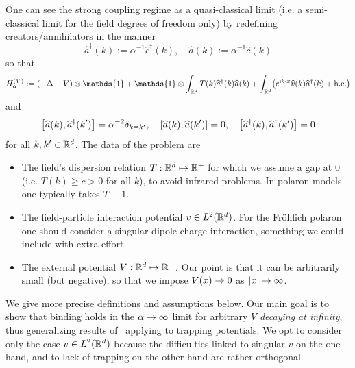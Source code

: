 \documentclass[10pt]{amsart}
\theoremstyle{definition}\newtheorem{defi}[theo]{Definition}\newtheorem{rema}[theo]{Remark}\newtheorem{exam}[theo]{Example}\newtheorem{exem}[theo]{Example}\newtheorem{nota}[theo]{Notation}
\newcommand{\im}{\mathrm{i}}
\newcommand{\R}{\mathbb{R}}
\newcommand{\1}{\mathds{1}}
\let\oldin\in
\renewcommand{\in}{\mathchoice{\oldin}{\oldin}{\,\oldin\,}{\,\oldin\,}}
\renewcommand*{\to}{\mathchoice{\longrightarrow}{\rightarrow}{\rightarrow}{\rightarrow}}
\let\oldmapsto\mapsto
\renewcommand*{\mapsto}{\mathchoice{\longmapsto}{\oldmapsto}{\oldmapsto}{\oldmapsto}}
\let\originalleft\left
\let\originalright\right
\renewcommand{\left}{\mathopen{}\mathclose\bgroup\originalleft}
\renewcommand{\right}{\aftergroup\egroup\originalright}
\begin{document}
One can see the strong coupling regime as a quasi-classical limit (i.e. a semi-classical limit for the field degrees of freedom only) by redefining creators/annihilators in the manner
\begin{equation}\label{eq:scaleop}
\widehat{a}^\dagger (k) := \alpha^{-1} \widehat{c}^\dagger (k), \quad \widehat{a} (k) := \alpha^{-1} \widehat{c} (k)
\end{equation}
so that
\begin{equation}\label{eq:intro-hamil-bis}
H_\alpha ^{(V)} := \left(-\Delta + V\right) \otimes \1 + \1 \otimes \int_{\R^d} T(k) \widehat{a}^\dagger (k) \widehat{a} (k) + \int_{\R^d} \left(e^{\im k\cdot x} \widehat{v} (k) \widehat{a}^{\dagger} (k) + \text{h.c.} \right)
\end{equation}
and
\begin{equation}\label{eq:intro CCR}
\left[\widehat{a} (k), \widehat{a}^\dagger (k')\right] = \alpha^{-2} \delta_{k=k'}, \quad [\widehat{a} (k), \widehat{a} (k')] = 0, \quad \left[\widehat{a}^\dagger (k), \widehat{a}^\dagger (k')\right] = 0
\end{equation}
for all $k,k'\in \R^d$. The data of the problem are
\begin{itemize}
\item The field's dispersion relation $T:\R^d \mapsto \R^+$ for which we assume a gap at $0$ (i.e. $T(k) \geq c >0$ for all $k$), to avoid infrared problems. In polaron models one typically takes $T \equiv 1$.
\item The field-particle interaction potential $v\in L^2 (\R^d)$. For the Fr\"ohlich polaron one should consider a singular dipole-charge interaction, something we could include with extra effort.
\item The external potential $V:\R^d \mapsto \R^-$. Our point is that it can be arbitrarily small (but negative), so that we impose $V(x)\to 0$ as $\lvert x \rvert \to \infty$.
\end{itemize}
We give more precise definitions and assumptions below. Our main goal is to show that binding holds in the $\alpha\to \infty$ limit for arbitrary $V$ \emph{decaying at infinity}, thus generalizing results of~\cite{CorFalOli-20} applying to trapping potentials. We opt to consider only the case $v\in L^2(\R^d)$ because the difficulties linked to singular $v$ on the one hand, and to lack of trapping on the other hand are rather orthogonal.
\end{document}
